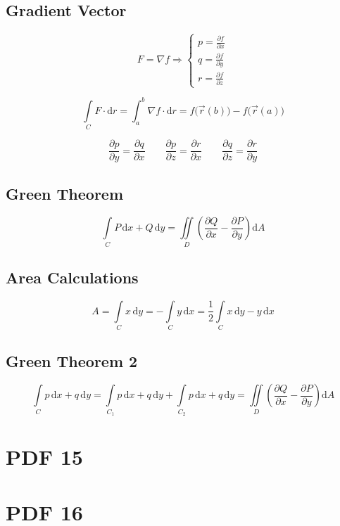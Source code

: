 \documentclass[12pt, fleqn]{book}
\begin{document}
    \section{Gradient Vector}
		\begin{equation}
			F = \nabla f \Rightarrow
			\begin{cases}
				p = \frac{\partial f}{\partial x} \\
				q = \frac{\partial f}{\partial y} \\
				r = \frac{\partial f}{\partial z} 
			\end{cases}
		\end{equation} 
		
		\begin{equation}
			\int\limits_C F \cdot \mathrm{d}r = \int_{a}^{b} \nabla f \cdot \mathrm{d}r = f\big(\vec{r}(b)\big) - f\big(\vec{r}(a)\big)
		\end{equation}     
		
		\begin{equation}
			\frac{\partial p}{\partial y} = \frac{\partial q}{\partial x} \qquad
			\frac{\partial p}{\partial z} = \frac{\partial r}{\partial x} \qquad
			\frac{\partial q}{\partial z} = \frac{\partial r}{\partial y}
		\end{equation}
		
		\section{Green Theorem}
			\begin{equation}
				\int\limits_C P \, \mathrm{d}x + Q \, \mathrm{d}y = \iint\limits_D \left(\frac{\partial Q}{\partial x} - \frac{\partial P}{\partial y}\right) \mathrm{d}A
			\end{equation}
		
		\section{Area Calculations}
			\begin{equation}
				A = \int\limits_C x \, \mathrm{d}y = - \int\limits_C y \, \mathrm{d}x = \frac{1}{2} \int\limits_C x \, \mathrm{d}y - y \, \mathrm{d}x
			\end{equation}

		\section{Green Theorem 2}
			\begin{equation}
				\int\limits_C p \, \mathrm{d}x + q \, \mathrm{d}y = \int\limits_{C_{1}} p \, \mathrm{d}x + q \, \mathrm{d}y + \int\limits_{C_{2}} p \, \mathrm{d}x + q \, \mathrm{d}y = \iint\limits_D \left(\frac{\partial Q}{\partial x} - \frac{\partial P}{\partial y}\right) \mathrm{d}A
			\end{equation}
		
\chapter{PDF 15}\label{pdf15}
\chapter{PDF 16}\label{pdf16}
\end{document}
